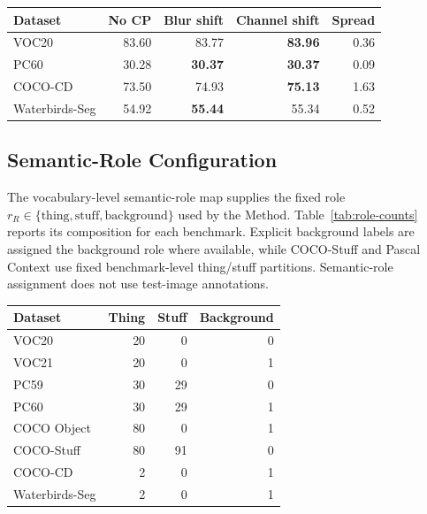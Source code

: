 \documentclass[letterpaper]{article}
\begin{document}
\noindent\begin{minipage}{\columnwidth}
    \centering
    \label{tab:cf-robustness}
    \small
    \setlength{\tabcolsep}{3.6pt}
    \begin{tabular}{lrrrr}
        \toprule
        Dataset & No CP & Blur shift & Channel shift & Spread \\
        \midrule
        VOC20 & 83.60 & 83.77 & \textbf{83.96} & 0.36 \\
        PC60 & 30.28 & \textbf{30.37} & \textbf{30.37} & 0.09 \\
        COCO-CD & 73.50 & 74.93 & \textbf{75.13} & 1.63 \\
        Waterbirds-Seg & 54.92 & \textbf{55.44} & 55.34 & 0.52 \\
        \bottomrule
    \end{tabular}
\end{minipage}

\subsection{Semantic-Role Configuration}

The vocabulary-level semantic-role map supplies the fixed role $r_R\in\{\mathrm{thing},\mathrm{stuff},\mathrm{background}\}$ used by the Method. Table~\ref{tab:role-counts} reports its composition for each benchmark. Explicit background labels are assigned the background role where available, while COCO-Stuff and Pascal Context use fixed benchmark-level thing/stuff partitions. Semantic-role assignment does not use test-image annotations.

\noindent\begin{minipage}{\columnwidth}
    \centering
    \label{tab:role-counts}
    \small
    \setlength{\tabcolsep}{4.5pt}
    \begin{tabular}{lrrr}
        \toprule
        Dataset & Thing & Stuff & Background \\
        \midrule
        VOC20 & 20 & 0 & 0 \\
        VOC21 & 20 & 0 & 1 \\
        PC59 & 30 & 29 & 0 \\
        PC60 & 30 & 29 & 1 \\
        COCO Object & 80 & 0 & 1 \\
        COCO-Stuff & 80 & 91 & 0 \\
        COCO-CD & 2 & 0 & 1 \\
        Waterbirds-Seg & 2 & 0 & 1 \\
        \bottomrule
    \end{tabular}
\end{minipage}
\end{document}
